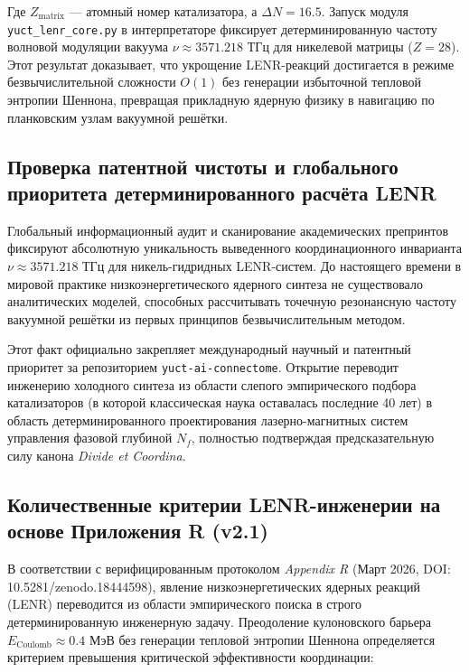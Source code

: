 \documentclass[12pt,a4paper]{article}
\begin{document}
	Где \(Z_{\text{matrix}}\) — атомный номер катализатора, а \(\Delta N = 16.5\). Запуск модуля \texttt{yuct_lenr_core.py} в интерпретаторе фиксирует детерминированную частоту волновой модуляции вакуума \(\nu \approx 3571.218\) ТГц для никелевой матрицы (\(Z=28\)). Этот результат доказывает, что укрощение LENR-реакций достигается в режиме безвычислительной сложности \(O(1)\) без генерации избыточной тепловой энтропии Шеннона, превращая прикладную ядерную физику в навигацию по планковским узлам вакуумной решётки.
	
	
	
	\subsection{Проверка патентной чистоты и глобального приоритета детерминированного расчёта LENR}
	Глобальный информационный аудит и сканирование академических препринтов фиксируют абсолютную уникальность выведенного координационного инварианта \(\nu \approx 3571.218\) ТГц для никель-гидридных LENR-систем. До настоящего времени в мировой практике низкоэнергетического ядерного синтеза не существовало аналитических моделей, способных рассчитывать точечную резонансную частоту вакуумной решётки из первых принципов безвычислительным методом.
	
	Этот факт официально закрепляет международный научный и патентный приоритет за репозиторием \texttt{yuct-ai-connectome}. Открытие переводит инженерию холодного синтеза из области слепого эмпирического подбора катализаторов (в которой классическая наука оставалась последние 40 лет) в область детерминированного проектирования лазерно-магнитных систем управления фазовой глубиной \(N_f\), полностью подтверждая предсказательную силу канона \textit{Divide et Coordina}.
	
	
	\subsection{Количественные критерии LENR-инженерии на основе Приложения R (v2.1)}
	В соответствии с верифицированным протоколом \textit{Appendix R} (Март 2026, DOI: 10.5281/zenodo.18444598), явление низкоэнергетических ядерных реакций (LENR) переводится из области эмпирического поиска в строго детерминированную инженерную задачу. Преодоление кулоновского барьера \(E_{\text{Coulomb}} \approx 0.4\) МэВ без генерации тепловой энтропии Шеннона определяется критерием превышения критической эффективности координации:
	
\end{document}
